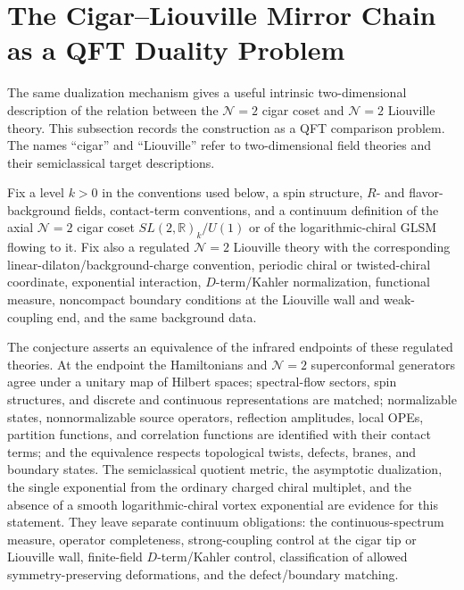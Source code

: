 \section{The Cigar--Liouville Mirror Chain as a QFT Duality Problem}
\label{sec:cigar-liouville-mirror-qft-problem}

The same dualization mechanism gives a useful intrinsic two-dimensional
description of the relation between the \(\mathcal N=2\) cigar coset and
\(\mathcal N=2\) Liouville theory.  This subsection records the construction
as a QFT comparison problem.  The names ``cigar'' and ``Liouville'' refer to
two-dimensional field theories and their semiclassical target descriptions.

\begin{conjecture}
\label{conj:cigar-liouville-mirror-qft}
Fix a level \(k>0\) in the conventions used below, a spin structure, \(R\)-
and flavor-background fields, contact-term conventions, and a continuum
definition of the axial \(\mathcal N=2\) cigar coset
\(SL(2,\mathbb R)_k/U(1)\) or of the logarithmic-chiral GLSM flowing to it.
Fix also a regulated \(\mathcal N=2\) Liouville theory with the corresponding
linear-dilaton/background-charge convention, periodic chiral or twisted-chiral
coordinate, exponential interaction, \(D\)-term/Kahler normalization,
functional measure, noncompact boundary conditions at the Liouville wall and
weak-coupling end, and the same background data.

The conjecture asserts an equivalence of the infrared endpoints of these
regulated theories.  At the endpoint the Hamiltonians and \(\mathcal N=2\)
superconformal generators agree under a unitary map of Hilbert spaces;
spectral-flow sectors, spin structures, and discrete and continuous
representations are matched; normalizable states, nonnormalizable source
operators, reflection amplitudes, local OPEs, partition functions, and
correlation functions are identified with their contact terms; and the
equivalence respects topological twists, defects, branes, and boundary states.
The semiclassical quotient metric, the asymptotic dualization, the single
exponential from the ordinary charged chiral multiplet, and the absence of a
smooth logarithmic-chiral vortex exponential are evidence for this statement.
They leave separate continuum obligations: the continuous-spectrum measure,
operator completeness, strong-coupling control at the cigar tip or Liouville
wall, finite-field \(D\)-term/Kahler control, classification of allowed
symmetry-preserving deformations, and the defect/boundary matching.
\end{conjecture}


